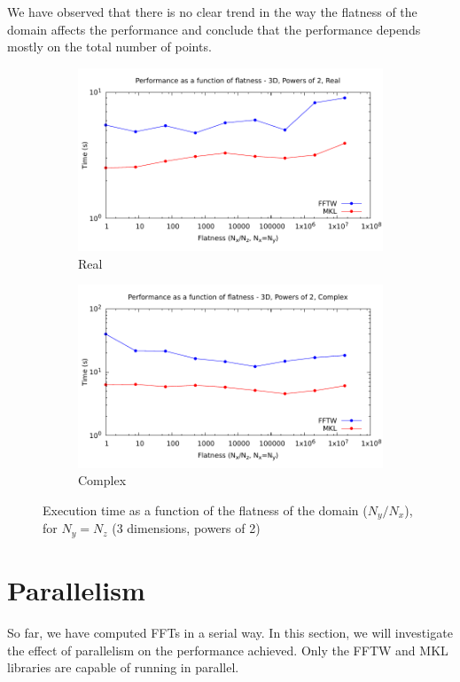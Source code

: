 \documentclass[12pt, a4paper]{article}
\begin{document}
We have observed that there is no clear trend in the way the flatness of the domain affects the performance and conclude that the performance depends mostly on the total number of points.

\begin{figure}[H]
\captionsetup{width=0.8\linewidth}
\centering
\begin{subfigure}{.5\textwidth}
\centering
\includegraphics[width=.9\linewidth]{graphs/flatness-r.pdf}
\caption{Real}
\label{FLATNESSR}
\end{subfigure}%
\begin{subfigure}{.5\textwidth}
\centering
\includegraphics[width=.9\linewidth]{graphs/flatness-c.pdf}
\caption{Complex}
\label{FLATNESSC}
\end{subfigure}
\caption{Execution time as a function of the flatness of the domain ($N_y/N_x$), for $N_y=N_z$ (3 dimensions, powers of 2)}
\label{FLATNESS}
\end{figure}

\section{Parallelism}\label{PARALLELISM}
So far, we have computed FFTs in a serial way. In this section, we will investigate the effect of parallelism on the performance achieved. Only the FFTW and MKL libraries are capable of running in parallel.  
\end{document}
